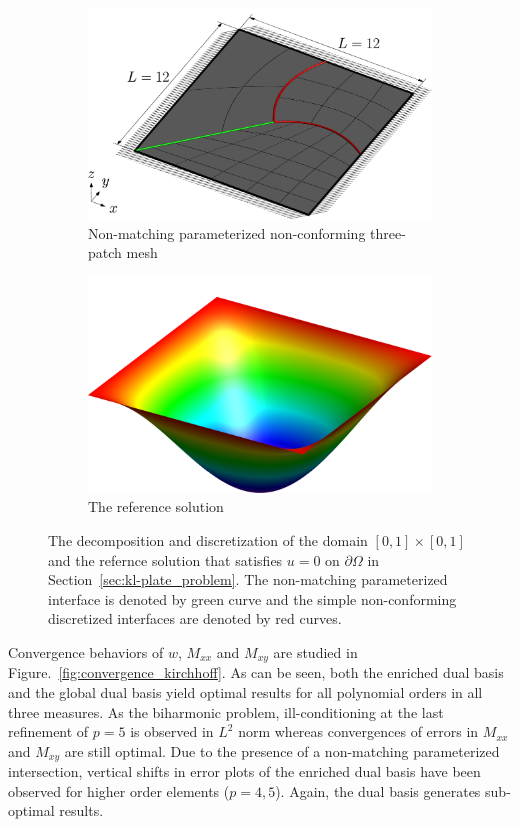 \begin{figure}[ht]
	\center
	\begin{subfigure}[t]{.45\linewidth}
		\center
		\includegraphics[scale=.4]{plate_config-plot}
		\caption{Non-matching parameterized non-conforming three-patch mesh}
	\end{subfigure}
	\begin{subfigure}[t]{.45\linewidth}
		\center
		\includegraphics[scale=.3]{plate_solution-plot}
		\caption{The reference solution}
	\end{subfigure}
	\caption{The decomposition and discretization of the domain $\left[0, 1\right] \times \left[0, 1\right]$ and the refernce solution that satisfies $u=0$ on $\partial\Omega$ in Section~\ref{sec:kl-plate_problem}. The non-matching parameterized interface is denoted by green curve and the simple non-conforming discretized interfaces are denoted by red curves.}\label{fig:kirchhoff_mesh}
\end{figure}
Convergence behaviors of $w$, $M_{xx}$ and $M_{xy}$ are studied in Figure.~\ref{fig:convergence_kirchhoff}. As can be seen, both the enriched dual basis and the global dual basis yield optimal results for all polynomial orders in all three measures. As the biharmonic problem, ill-conditioning at the last refinement of $p=5$ is observed in $L^2$ norm whereas convergences of errors in $M_{xx}$ and $M_{xy}$ are still optimal. Due to the presence of a non-matching parameterized intersection, vertical shifts in error plots of the enriched dual basis have been observed for higher order elements ($p = 4,5$). Again, the \Bezier dual basis generates sub-optimal results. \par

